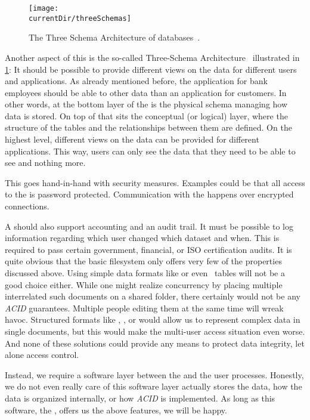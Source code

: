 \begin{figure}%
\centering%
\texttt{[image: \\currentDir/threeSchemas]}%
\caption{The Three Schema Architecture of databases~\cite{AXSSGDMS1978FRODMS,TK1978TAXSDFROTSGODMS,BFJKMRGRT1985RMFDSDAFTGDOTAXSDSSG,SS2005EIDDDFDB:I}.}%
\label{fig:threeSchemas}%
\end{figure}

Another aspect of this is the so-called Three-Schema Architecture~\cite{AXSSGDMS1978FRODMS,TK1978TAXSDFROTSGODMS,BFJKMRGRT1985RMFDSDAFTGDOTAXSDSSG,SS2005EIDDDFDB:I} illustrated in \cref{fig:threeSchemas}:
It should be possible to provide different views on the data for different users and applications.
As already mentioned before, the application for bank employees should be able to  other data than an application for customers.
In other words, at the bottom layer of the  is the physical schema managing how data is stored.
On top of that sits the conceptual (or logical) layer, where the structure of the tables and the relationships between them are defined.
On the highest level, different views on the data can be provided for different applications.
This way, users can only see the data that they need to be able to see and nothing more.

This goes hand-in-hand with security measures.
Examples could be that all access to the  is password protected.
Communication with the  happens over encrypted connections.

A  should also support accounting and an audit trail.
It must be possible to log information regarding which user changed which dataset and when.
This is required to pass certain government, financial, or ISO certification audits.
\endhsection%
%
%
It is quite obvious that the basic filesystem only offers very few of the properties discussed above.
Using simple data formats like  or even \microsoftExcel\ tables will not be a good choice either.
While one might realize concurrency by placing multiple interrelated such documents on a shared folder, there certainly would not be any \emph{ACID} guarantees.
Multiple people editing them at the same time will wreak havoc.
Structured formats like , , or  would allow us to represent complex data in single documents, but this would make the multi-user access situation even worse.
And none of these solutions could provide any means to protect data integrity, let alone access control.

Instead, we require a software layer between the  and the user processes.
Honestly, we do not even really care of this software layer actually stores the data, how the data is organized internally, or how \emph{ACID} is implemented.
As long as this software, the , offers us the above features, we will be happy.%
\endhsection%
\endhsection%
%
